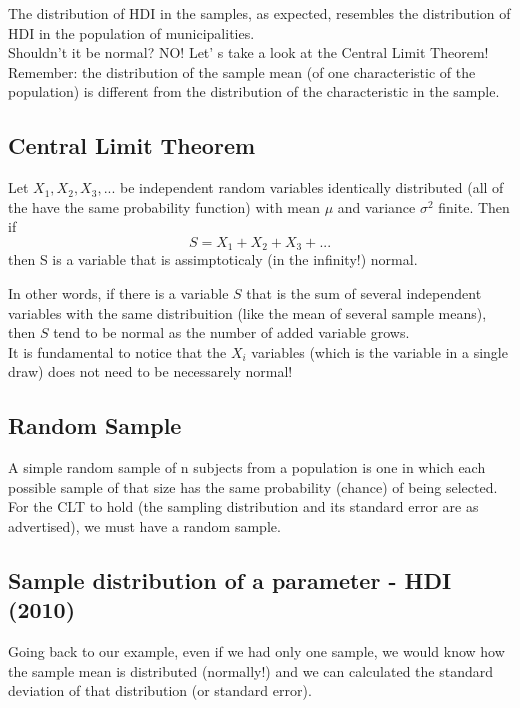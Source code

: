 \documentclass[11pt]{article}
\begin{document}
	The distribution of HDI in the samples, as expected, resembles the distribution of HDI in the population of municipalities.\\

	Shouldn't it be normal? NO! Let' s take a look at the Central Limit Theorem!\\

	Remember: the distribution of the sample mean (of one characteristic of the population) is different from the distribution of the characteristic in the sample.

	\subsection*{Central Limit Theorem}
	Let $X_1,X_2,X_3,...$ be independent random variables identically distributed (all of the have the same probability function) with mean $\mu$ and variance $\sigma^2$ finite. Then if
	\[S= X_1 + X_2 + X_3 +...\]
	then S is a variable that is assimptoticaly (in the infinity!) normal.

	In other words, if there is a variable $S$ that is the sum of several independent variables with the same distribuition (like the mean of several sample means), then $S$ tend to be normal as the number of added variable grows.\\
	
	It is fundamental to notice that the $X_i$ variables (which is the variable in a single draw) does not need to be necessarely normal!

	\subsection*{Random Sample}
	A simple random sample of n subjects from a population is  one in which each possible sample of that size has the same probability (chance) of being selected.\\

For the CLT to hold (the sampling distribution and its standard error are as advertised), we must have a random  sample.

	\subsection*{Sample distribution of a parameter - HDI (2010)}
Going back to our example, even if we had only one sample, we would know how the sample mean is distributed (normally!) and we can calculated the standard deviation of that distribution (or standard error).\\
\end{document}
